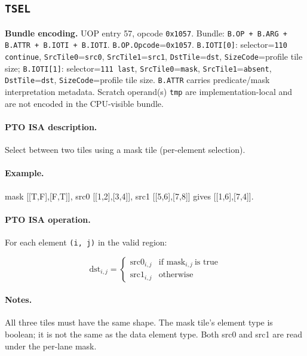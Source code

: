 \subsection{\texttt{TSEL}}
\noindent\textbf{Bundle encoding.} UOP entry 57, opcode \texttt{0x1057}. Bundle: \texttt{B.OP + B.ARG + B.ATTR + B.IOTI + B.IOTI}. \texttt{B.OP.Opcode}=\texttt{0x1057}. \texttt{B.IOTI[0]}: selector=\texttt{110 continue}, \texttt{SrcTile0}=\texttt{src0}, \texttt{SrcTile1}=\texttt{src1}, \texttt{DstTile}=\texttt{dst}, \texttt{SizeCode}=profile tile size; \texttt{B.IOTI[1]}: selector=\texttt{111 last}, \texttt{SrcTile0}=\texttt{mask}, \texttt{SrcTile1}=\texttt{absent}, \texttt{DstTile}=\texttt{dst}, \texttt{SizeCode}=profile tile size. \texttt{B.ATTR} carries predicate/mask interpretation metadata. Scratch operand(s) \texttt{tmp} are implementation-local and are not encoded in the CPU-visible bundle.\par\smallskip
{\small
\paragraph{PTO ISA description.}
Select between two tiles using a mask tile (per-element selection).
\paragraph{Example.}
mask [[T,F],[F,T]], src0 [[1,2],[3,4]], src1 [[5,6],[7,8]] gives [[1,6],[7,4]].
\par\smallskip
\paragraph{PTO ISA operation.}
For each element \texttt{(i, j)} in the valid region:

\[
\mathrm{dst}_{i,j} =
\begin{cases}
\mathrm{src0}_{i,j} & \text{if } \mathrm{mask}_{i,j}\ \text{is true} \\
\mathrm{src1}_{i,j} & \text{otherwise}
\end{cases}
\]
}\par\smallskip
\paragraph{Notes.}
All three tiles must have the same shape. The mask tile's element type is boolean; it is not the same as the data element type. Both src0 and src1 are read under the per-lane mask.
